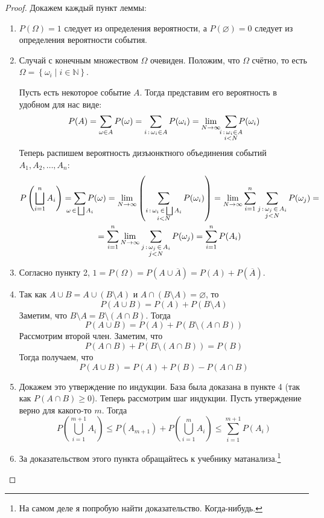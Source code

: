 \documentclass[a4paper,12pt]{article}
\begin{document}
\begin{proof}
Докажем каждый пункт леммы:
\begin{enumerate}
    \item \(P(\Omega) = 1\) следует из определения вероятности, а \(P(\varnothing) = 0\) следует из определения вероятности события.
    
    \item Случай с конечным множеством \(\Omega\) очевиден. Положим, что \(\Omega\) счётно, то есть \(\Omega = \left\{\omega_i \mid i \in \mathbb{N}\right\}\).
    
    Пусть есть некоторое событие \(A\). Тогда представим его вероятность в удобном для нас виде:
    \[P(A) = \sum_{\omega \in A} P(\omega) = \sum_{i\,:\,\omega_i \in A} P(\omega_i) = 
    \lim_{N \to \infty}\ \sum_{\mathclap{\substack{i\,:\, \omega_i \in A\\
    i < N}}} P(\omega_i)\]
    Теперь распишем вероятность дизъюнктного объединения событий \(A_1, A_2, \ldots, A_n\):
    \begin{multline*}
        P\left(\bigsqcup_{i = 1}^{n} A_i\right) = \sum_{\mathclap{\omega\,\in\,\bigsqcup A_i}} P(\omega) =
        \lim_{N \to \infty} \left(\sum_{\substack{i\,:\,\omega_i\,\in\,\bigsqcup A_i\\i < N}} P(\omega_i)\right) =
        \lim_{N \to \infty} \sum_{i = 1}^{n} \sum_{\substack{j\,:\,\omega_j\,\in\,A_i\\j < N}} P(\omega_j) = \\
        = \sum_{i = 1}^{n} \lim_{N \to \infty} \sum_{\substack{j\,:\,\omega_j\,\in\,A_i\\j < N}} P(\omega_j) = 
        \sum_{i = 1}^{n} P(A_i)
    \end{multline*}
    
    \item Согласно пункту 2, \(1 = P(\Omega) = P(A \cup \overline{A}) = P(A) + P(\overline{A})\).
    
    \item Так как \(A \cup B = A \cup (B \setminus A)\) и \(A \cap (B \setminus A) = \varnothing\), то \[P(A \cup B) = P(A) + P(B \setminus A)\]
    Заметим, что \(B \setminus A = B \setminus (A \cap B)\). Тогда
    \[P(A \cup B) = P(A) + P(B \setminus (A \cap B))\]
    Рассмотрим второй член. Заметим, что
    \[P(A \cap B) + P(B \setminus (A \cap B)) = P(B)\]
    Тогда получаем, что
    \[P(A \cup B) = P(A) + P(B) - P(A \cap B)\]
    
    \item Докажем это утверждение по индукции. База была доказана в пункте 4 (так как \(P(A \cap B) \geq 0\)). Теперь рассмотрим шаг индукции. Пусть утверждение верно для какого-то \(m\). Тогда
    \[P\left(\bigcup_{i = 1}^{m + 1} A_i\right) \leq P(A_{m + 1}) + P\left(\bigcup_{i = 1}^{m} A_i\right) \leq \sum\limits_{i = 1}^{m + 1} P(A_i)\]
    
    \item За доказательством этого пункта обращайтесь к учебнику матанализа.\footnote{На самом деле я попробую найти доказательство. Когда-нибудь.}
\end{enumerate}
\end{proof}
\end{document}
